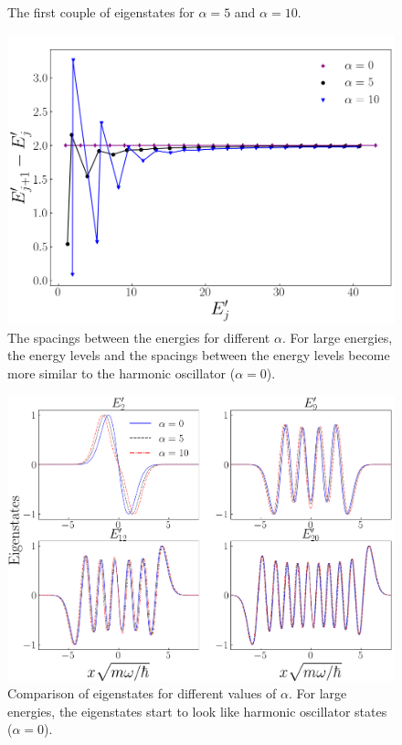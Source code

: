 \documentclass[twocolumn]{article}
\begin{document}
\begin{large}
\begin{figure}[b!]
    \caption{The first couple of eigenstates for $\alpha=5$ and $\alpha=10$.}
    \label{5apr0727}
\end{figure}
\begin{figure}[t!]
    \centering
    \includegraphics[scale=0.35]{relationship.png}
    \caption{The spacings between the energies for different $\alpha$. For large energies, the energy levels and the spacings between the energy levels become more similar to the harmonic oscillator ($\alpha=0$).}
    \label{4apr2044}
\end{figure}
\begin{figure}
    \centering
    \includegraphics[scale=0.33]{high_energy_comparison.png}
    \caption{Comparison of eigenstates for different values of $\alpha$. For large energies, the eigenstates start to look like harmonic oscillator states ($\alpha=0$).}

\end{figure}
\end{large}
\end{document}
